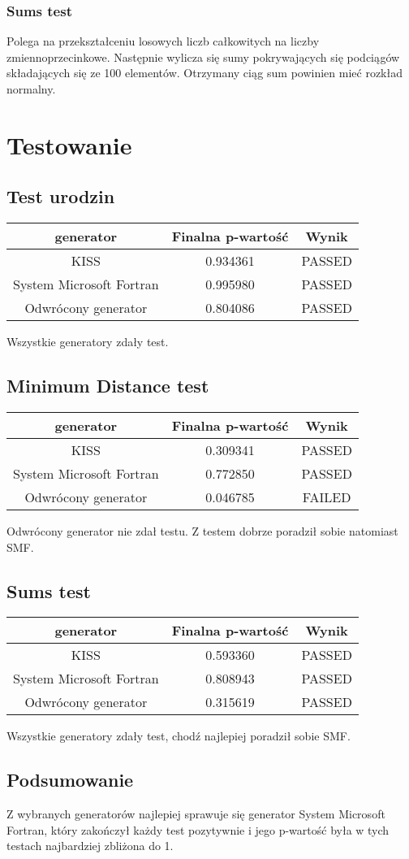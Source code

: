 \documentclass[11pt]{aghdpl}
\begin{document}
\subsubsection{Sums test}
Polega na przekształceniu losowych liczb całkowitych na liczby zmiennoprzecinkowe. Następnie wylicza się sumy pokrywających się podciągów składających się ze 100 elementów. Otrzymany ciąg sum powinien mieć rozkład normalny.
\section{Testowanie}
\subsection{Test urodzin}
\begin{center}
\begin{tabular}{ccc}
generator & Finalna p-wartość & Wynik \\ \hline
KISS &  0.934361  & PASSED \\
System Microsoft Fortran & 0.995980 & PASSED \\
Odwrócony generator & 0.804086 & PASSED \\
\end{tabular}
\end{center}
Wszystkie generatory zdały test.
\subsection{Minimum Distance test}
\begin{center}
\begin{tabular}{ccc}
generator & Finalna p-wartość & Wynik \\ \hline
KISS &  0.309341  & PASSED \\
System Microsoft Fortran & 0.772850 & PASSED \\
Odwrócony generator & 0.046785 & FAILED \\
\end{tabular}
\end{center}
Odwrócony generator nie zdał testu. Z testem dobrze poradził sobie natomiast SMF.
\subsection{Sums test}
\begin{center}
\begin{tabular}{ccc}
generator & Finalna p-wartość & Wynik \\ \hline
KISS & 0.593360 & PASSED \\
System Microsoft Fortran & 0.808943 & PASSED \\
Odwrócony generator & 0.315619  & PASSED \\
\end{tabular}
\end{center}
Wszystkie generatory zdały test, chodź najlepiej poradził sobie SMF.
\subsection{Podsumowanie}
Z wybranych generatorów najlepiej sprawuje się generator System Microsoft Fortran, który zakończył każdy test pozytywnie i jego p-wartość była w tych testach najbardziej zbliżona do 1.
\end{document}

